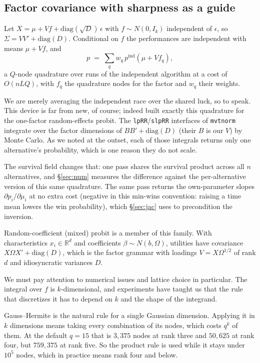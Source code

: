 \documentclass[11pt]{article}
\newcommand{\R}{\mathbb{R}}
\begin{document}
\subsection{Factor covariance with sharpness as a guide}\label{sec:factor}

Let $X=\mu+Vf+\mathrm{diag}(\sqrt D)\,\epsilon$ with $f\sim N(0,I_k)$
independent of $\epsilon$, so $\Sigma=VV'+\mathrm{diag}(D)$. Conditional on $f$
the performances are independent with means $\mu+Vf$, and
\begin{equation}
p \;=\; \sum_q w_q\, p^{\mathrm{ind}}(\mu+Vf_q),
\end{equation}
a $Q$-node quadrature over runs of the independent algorithm at a cost of
$O(nLQ)$, with $f_q$ the quadrature nodes for the factor and $w_q$ their
weights.

We are merely averaging the independent race over the shared luck, so to speak. This device is far from new, of course; indeed
\citet{butler1982} built exactly this quadrature for the one-factor
random-effects probit. The \texttt{lpRR}/\texttt{slpRR} interfaces of
\texttt{mvtnorm} integrate over the factor dimensions of
$BB'+\mathrm{diag}(D)$ (their $B$ is our $V$) by Monte Carlo. As we noted at the outset, each of
those integrals returns only one alternative's probability, which is one
reason they do not scale.

The survival field changes that: one pass shares the survival product across all
$n$ alternatives, and \S\ref{sec:num} measures the difference against the
per-alternative version of this same quadrature. The same pass returns the own-parameter slopes $\partial p_i/\partial\mu_i$
at no extra cost (negative in this min-wins convention: raising a time
mean lowers the win probability), which \S\ref{sec:jac} uses to
precondition the inversion.

Random-coefficient (mixed) probit is a member of this family. With
characteristics $x_i\in\R^{d}$ and coefficients
$\beta\sim N(b,\Omega)$, utilities have covariance
$X\Omega X'+\mathrm{diag}(D)$, which is the factor grammar with loadings
$V=X\Omega^{1/2}$ of rank $d$ and idiosyncratic variances $D$.

We must pay attention to numerical issues and lattice choice in particular. The integral over $f$ is $k$-dimensional, and experiments have taught us that the rule that discretizes it
has to depend on $k$ and the shape of the integrand.

Gauss--Hermite is the natural rule for a single Gaussian dimension.
Applying it in $k$ dimensions means taking every combination of its
nodes, which costs $q^{k}$ of them. At the default $q=15$ that is
$3{,}375$ nodes at rank three and $50{,}625$ at rank four, but
$759{,}375$ at rank five. So the product rule is used while it stays
under $10^{5}$ nodes, which in practice means rank four and below.
\end{document}
